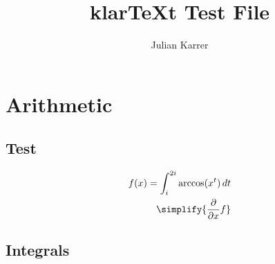 \documentclass[oneside, a4paper]{article}
\author{Julian Karrer}
\title{klarTeXt Test File}
\begin{document}
\maketitle

\section*{Arithmetic}

\subsection*{Test}
\begin{program}
    \begin{align*}
        f(x) = \int_{i}^{2i} \arccos(x^t)\,dt \\
        \simplify{\ddx{x} f}\\
    \end{align*}
\end{program}

\subsection*{Integrals}


\end{document}
